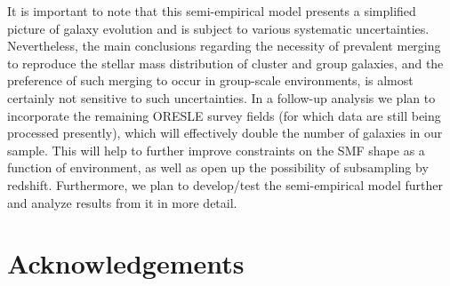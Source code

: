 \documentclass[a4paper,fleqn,usenatbib]{mnras}
\begin{document}
It is important to note that this semi-empirical model presents a simplified picture of galaxy evolution and is subject to various systematic uncertainties.
Nevertheless, the main conclusions regarding the necessity of prevalent merging to reproduce the stellar mass distribution of cluster and group galaxies, and the preference of such merging to occur in group-scale environments, is almost certainly not sensitive to such uncertainties.
In a follow-up analysis we plan to incorporate the remaining ORESLE survey fields (for which data are still being processed presently), which will effectively double the number of galaxies in our sample.
This will help to further improve constraints on the SMF shape as a function of environment, as well as open up the possibility of subsampling by redshift.
Furthermore, we plan to develop/test the semi-empirical model further and analyze results from it in more detail.





\section*{Acknowledgements}
\end{document}
